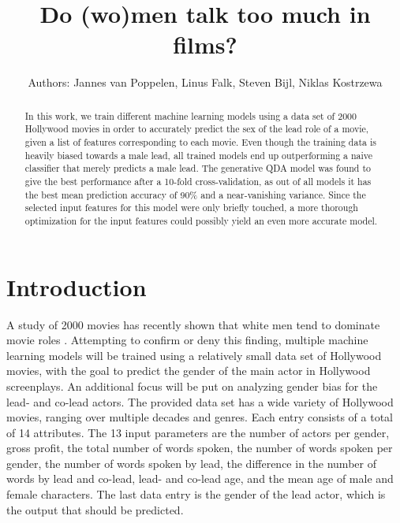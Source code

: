 \documentclass{article}
\title{Do (wo)men talk too much in films?}
\begin{document}
\author{Authors: Jannes van Poppelen, Linus Falk, Steven Bijl, Niklas Kostrzewa}
\maketitle

\begin{abstract}
    In this work, we train different machine learning models using a data set of 2000 Hollywood movies in order to accurately predict the sex of the lead role of a movie, given a list of features corresponding to each movie. Even though the training data is heavily biased towards a male lead, all trained models end up outperforming a naive classifier that merely predicts a male lead. The generative QDA model was found to give the best performance after a 10-fold cross-validation, as out of all models it has the best mean prediction accuracy of 90\% and a near-vanishing variance. Since the selected input features for this model were only briefly touched, a more thorough optimization for the input features could possibly yield an even more accurate model.
\end{abstract}

\section{Introduction}
A study of 2000 movies has recently shown that white men tend to dominate movie roles \cite{dataset}. Attempting to confirm or deny this finding, multiple machine learning models will be trained using a relatively small data set of Hollywood movies, with the goal to predict the gender of the main actor in Hollywood screenplays. An additional focus will be put on analyzing gender bias for the lead- and co-lead actors. The provided data set has a wide variety of Hollywood movies, ranging over multiple decades and genres. Each entry consists of a total of 14 attributes. The 13 input parameters are the number of actors per gender, gross profit, the total number of words spoken, the number of words spoken per gender, the number of words spoken by lead, the difference in the number of words by lead and co-lead, lead- and co-lead age, and the mean age of male and female characters. The last data entry is the gender of the lead actor, which is the output that should be predicted.
\end{document}
